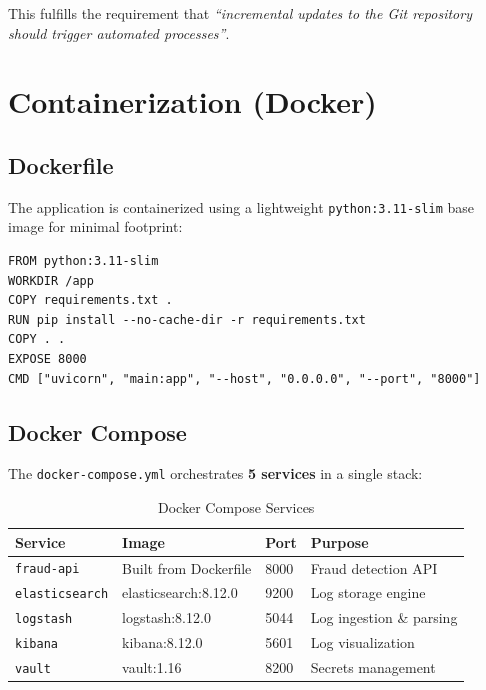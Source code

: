 \documentclass[12pt,a4paper]{article}
\begin{document}
This fulfills the requirement that \textit{``incremental updates to the Git repository should trigger automated processes''}.

\section{Containerization (Docker)}

\subsection{Dockerfile}

The application is containerized using a lightweight \texttt{python:3.11-slim} base image for minimal footprint:

\begin{lstlisting}[language={},caption={Dockerfile}]
FROM python:3.11-slim
WORKDIR /app
COPY requirements.txt .
RUN pip install --no-cache-dir -r requirements.txt
COPY . .
EXPOSE 8000
CMD ["uvicorn", "main:app", "--host", "0.0.0.0", "--port", "8000"]
\end{lstlisting}

\subsection{Docker Compose}

The \texttt{docker-compose.yml} orchestrates \textbf{5 services} in a single stack:

\begin{table}[H]
\centering
\caption{Docker Compose Services}
\begin{tabular}{@{}lllp{5cm}@{}}
\toprule
\textbf{Service} & \textbf{Image} & \textbf{Port} & \textbf{Purpose} \\
\midrule
\texttt{fraud-api} & Built from Dockerfile & 8000 & Fraud detection API \\
\texttt{elasticsearch} & elasticsearch:8.12.0 & 9200 & Log storage engine \\
\texttt{logstash} & logstash:8.12.0 & 5044 & Log ingestion \& parsing \\
\texttt{kibana} & kibana:8.12.0 & 5601 & Log visualization \\
\texttt{vault} & vault:1.16 & 8200 & Secrets management \\
\bottomrule
\end{tabular}
\end{table}
\end{document}
